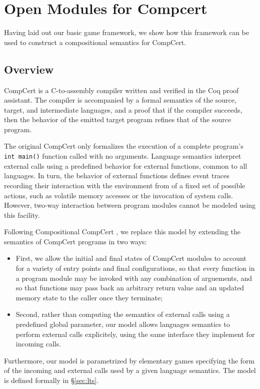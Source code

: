 \section{Open Modules for Compcert}

Having laid out our basic game framework,
we show how this framework can be used
to construct a compositional semantics for CompCert.

\subsection{Overview}

CompCert is a C-to-assembly compiler written and verified
in the Coq proof assistant.
The compiler is accompanied by
a formal semantics of the source, target, and intermediate languages,
and a proof that if the compiler succeeds,
then the behavior of the emitted target program
refines that of the source program.

The original CompCert
only formalizes the execution of a complete program's
\texttt{int main()} function called with no arguments.
Language semantics interpret external calls
using a predefined behavior for external functions,
common to all languages.
In turn,
the behavior of external functions
defines event traces
recording their interaction with the environment
from of a fixed set of possible actions,
such as volatile memory accesses or the invocation of system calls.
However,
two-way interaction between program modules
cannot be modeled using this facility.

Following Compositional CompCert \cite{compcompcert},
we replace this model by extending the semantics of CompCert programs
in two ways:
\begin{itemize}
\item First,
  we allow the initial and final states of CompCert modules
  to account for a variety of entry points and final configurations,
  so that every function in a program module
  may be invoked with any combination of arguements,
  and so that functions may pass back an arbitrary return value
  and an updated memory state to the caller
  once they terminate;
\item Second,
  rather than computing the semantics of external calls
  using a predefined global parameter,
  our model allows languages semantics to perform external calls explicitely,
  using the same interface they implement for incoming calls.
\end{itemize}
Furthermore,
our model is parametrized by elementary games
specifying the form of the incoming and external calls
used by a given language semantics.
The model is defined formally in \S\ref{sec:lts}.

